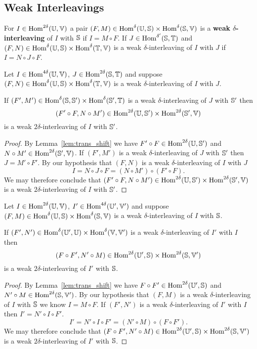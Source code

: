 \subsection{Weak Interleavings}

\begin{definition}
  For $I\in\Hom^{2\delta}(\U,\V)$ a pair $(F, M)\in \Hom^\delta(\U,\S)\times\Hom^\delta(\S,\V)$ is a \textbf{weak $\delta$-interleaving} of $I$ with $\S$ if $I = M\circ F$.
  If $J\in\Hom^{\delta'}(\S,\T)$ and $(F,N)\in\Hom^\delta(\U,\S)\times\Hom^\delta(\T,\V)$ is a weak $\delta$-interleaving of $I$ with $J$ if $I = N\circ J\circ F$.
\end{definition}

\begin{lemma}\label{lem:left}
  Let $I\in\Hom^{4\delta}(\U,\V)$, $J\in\Hom^{2\delta}(\S,\T)$ and suppose $(F, N)\in\Hom^{\delta}(\U,\S)\times\Hom^\delta(\T,\V)$ is a weak $\delta$-interleaving of $I$ with $J$.

  If $(F', M')\in\Hom^\delta(\S,\S')\times\Hom^\delta(\S',\T)$ is a weak $\delta$-interleaving of $J$ with $\S'$ then
  \[(F'\circ F, N\circ M')\in\Hom^{2\delta}(\U,\S')\times \Hom^{2\delta}(\S',\V)\]
  is a weak $2\delta$-interleaving of $I$ with $\S'$.
\end{lemma}
\begin{proof}
  By Lemma~\ref{lem:trans_shift} we have $F'\circ F\in\Hom^{2\delta}(\U,\S')$ and $N\circ M'\in \Hom^{2\delta}(\S',\V)$.
  If $(F', M')$ is a weak $\delta$-interleaving of $J$ with $\S'$ then $J = M'\circ F'$.
  By our hypothesis that $(F, N)$ is a weak $\delta$-interleaving of $I$ with $J$
  \[ I = N\circ J\circ F = (N\circ M')\circ (F'\circ F).\]
  We may therefore conclude that $(F'\circ F, N\circ M')\in\Hom^{2\delta}(\U,\S')\times \Hom^{2\delta}(\S',\V)$ is a weak $2\delta$-interleaving of $I$ with $\S'$.
\end{proof}

\begin{lemma}\label{lem:right}
  Let $I\in\Hom^{2\delta}(\U,\V)$, $I'\in\Hom^{4\delta}(\U',\V')$ and suppose $(F, M)\in\Hom^\delta(\U,\S)\times\Hom^\delta(\S,\V)$ is a weak $\delta$-interleaving of $I$ with $\S$.

  If $(F',N')\in\Hom^\delta(\U',\U)\times\Hom^\delta(\V,\V')$ is a weak $\delta$-interleaving of $I'$ with $I$ then
  \[(F\circ F', N'\circ M)\in\Hom^{2\delta}(\U',\S)\times\Hom^{2\delta}(\S,\V')\]
  is a weak $2\delta$-interleaving of $I'$ with $\S$.
\end{lemma}
\begin{proof}
  By Lemma~\ref{lem:trans_shift} we have $F\circ F'\in \Hom^{2\delta}(\U',\S)$ and $N'\circ M\in \Hom^{2\delta}(\S,\V')$.
  By our hypothesis that $(F, M)$ is a weak $\delta$-interleaving of $I$ with $\S$ we know $I = M\circ F$.
  If $(F',N')$ is a weak $\delta$-interleaving of $I'$ with $I$ then $I' = N'\circ I\circ F'$.
  \[ I' = N'\circ I\circ F' = (N'\circ M)\circ (F\circ F').\]
  We may therefore conclude that $(F\circ F', N'\circ M)\in\Hom^{2\delta}(\U',\S)\times\Hom^{2\delta}(\S,\V')$ is a weak $2\delta$-interleaving of $I'$ with $\S$.
\end{proof}

